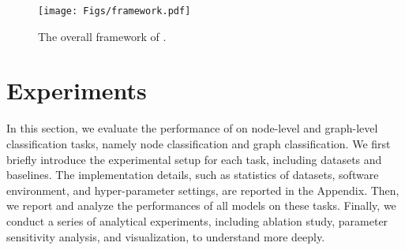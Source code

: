 \documentclass[sigconf, screen]{acmart}
\begin{document}
\begin{figure}[t]
\centering
\texttt{[image: Figs/framework.pdf]}
\caption{
The overall framework of \name.
}
\label{fig:fw}
\end{figure}











%
 \section{Experiments}

In this section, we evaluate the performance of \name on node-level and graph-level classification tasks, namely node classification and graph classification. 
We first briefly introduce the experimental setup for each task, including datasets and baselines.
The implementation details, such as statistics of datasets, software environment, and hyper-parameter settings, are reported in the Appendix.
Then, we report and analyze the performances of all models on these tasks. 
Finally, we conduct a series of analytical experiments, including ablation study, parameter sensitivity analysis, and visualization, to understand \name more deeply.
\end{document}
